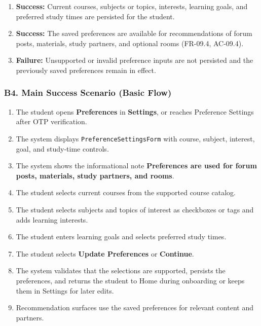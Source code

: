 \documentclass[12pt]{article}
\begin{document}
\begin{enumerate}
\item \textbf{Success:} Current courses, subjects or topics, interests, learning goals, and preferred study times are persisted for the student.
\item \textbf{Success:} The saved preferences are available for recommendations of forum posts, materials, study partners, and optional rooms (FR-09.4, AC-09.4).
\item \textbf{Failure:} Unsupported or invalid preference inputs are not persisted and the previously saved preferences remain in effect.
\end{enumerate}
\par\medskip

\hypertarget{sec:b4-main-success-scenario-basic-flow}{}
\subsubsection*{B4. Main Success Scenario (Basic Flow)}
\par\medskip

\begin{enumerate}
\item The student opens \textbf{Preferences} in \textbf{Settings}, or reaches Preference Settings after OTP verification.
\item The system displays \texttt{PreferenceSettingsForm} with course, subject, interest, goal, and study-time controls.
\item The system shows the informational note \textbf{Preferences are used for forum posts, materials, study partners, and rooms}.
\item The student selects current courses from the supported course catalog.
\item The student selects subjects and topics of interest as checkboxes or tags and adds learning interests.
\item The student enters learning goals and selects preferred study times.
\item The student selects \textbf{Update Preferences} or \textbf{Continue}.
\item The system validates that the selections are supported, persists the preferences, and returns the student to Home during onboarding or keeps them in Settings for later edits.
\item Recommendation surfaces use the saved preferences for relevant content and partners.
\end{enumerate}
\par\medskip
\end{document}

